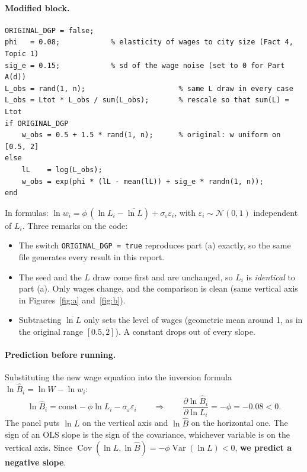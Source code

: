 \documentclass[11pt,a4paper]{article}
\begin{document}
\paragraph{Modified block.}
\begin{verbatim}
ORIGINAL_DGP = false;
phi   = 0.08;            % elasticity of wages to city size (Fact 4, Topic 1)
sig_e = 0.15;            % sd of the wage noise (set to 0 for Part A(d))
L_obs = rand(1, n);                      % same L draw in every case
L_obs = Ltot * L_obs / sum(L_obs);       % rescale so that sum(L) = Ltot
if ORIGINAL_DGP
    w_obs = 0.5 + 1.5 * rand(1, n);      % original: w uniform on [0.5, 2]
else
    lL    = log(L_obs);
    w_obs = exp(phi * (lL - mean(lL)) + sig_e * randn(1, n));
end
\end{verbatim}
In formulas: $\ln w_i = \phi\,(\ln L_i - \overline{\ln L}) + \sigma_\varepsilon \varepsilon_i$, with $\varepsilon_i \sim \mathcal N(0,1)$ independent of $L_i$. Three remarks on the code:
\begin{itemize}[leftmargin=1.5em]
    \item The switch \texttt{ORIGINAL\_DGP = true} reproduces part (a) exactly, so the same file generates every result in this report.
    \item The seed and the $L$ draw come first and are unchanged, so $L_i$ is \emph{identical} to part (a). Only wages change, and the comparison is clean (same vertical axis in Figures~\ref{fig:a} and~\ref{fig:b}).
    \item Subtracting $\overline{\ln L}$ only sets the level of wages (geometric mean around 1, as in the original range $[0.5, 2]$). A constant drops out of every slope.
\end{itemize}

\paragraph{Prediction before running.}
Substituting the new wage equation into the inversion formula $\ln \hat B_i = \ln W - \ln w_i$:
\begin{equation}
    \ln \hat B_i = \text{const} - \phi \ln L_i - \sigma_\varepsilon \varepsilon_i
    \qquad\Longrightarrow\qquad
    \frac{\partial \ln \hat B_i}{\partial \ln L_i} = -\phi = -0.08 < 0 .
    \label{eq:derivB}
\end{equation}
The panel puts $\ln L$ on the vertical axis and $\ln \hat B$ on the horizontal one. The sign of an OLS slope is the sign of the covariance, whichever variable is on the vertical axis. Since $\operatorname{Cov}(\ln L, \ln \hat B) = -\phi \operatorname{Var}(\ln L) < 0$, \textbf{we predict a negative slope}.
\end{document}
